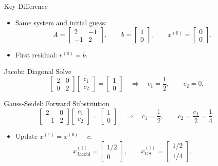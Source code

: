 \documentclass[10pt]{beamer}
\begin{document}
\begin{frame}{Key Difference}

\begin{itemize}
    \item Same system and initial guess:
    \[
        A=\begin{bmatrix}2&-1\\-1&2\end{bmatrix},
        \qquad
        b=\begin{bmatrix}1\\0\end{bmatrix},
        \qquad
        x^{(0)}=\begin{bmatrix}0\\0\end{bmatrix}.
    \]
    \item First residual: $r^{(0)}=b$.
\end{itemize}

\begin{block}{Jacobi: Diagonal Solve}
\[
    \begin{bmatrix}2&0\\0&2\end{bmatrix}
    \begin{bmatrix}c_1\\c_2\end{bmatrix}
    =
    \begin{bmatrix}1\\0\end{bmatrix}
    \quad\Longrightarrow\quad
    c_1=\frac12,\qquad c_2=0.
\]
\end{block}

\begin{block}{Gauss-Seidel: Forward Substitution}
\[
    \begin{bmatrix}2&0\\-1&2\end{bmatrix}
    \begin{bmatrix}c_1\\c_2\end{bmatrix}
    =
    \begin{bmatrix}1\\0\end{bmatrix}
    \quad\Longrightarrow\quad
    c_1=\frac12,\qquad c_2=\frac{c_1}{2}=\frac14.
\]
\end{block}

\begin{itemize}
    \item Update $x^{(1)}=x^{(0)}+c$:
    \[
        x_{\mathrm{Jacobi}}^{(1)}
        =\begin{bmatrix}1/2\\0\end{bmatrix},
        \qquad
        x_{\mathrm{GS}}^{(1)}
        =\begin{bmatrix}1/2\\1/4\end{bmatrix}.
    \]
\end{itemize}

\end{frame}
\end{document}
